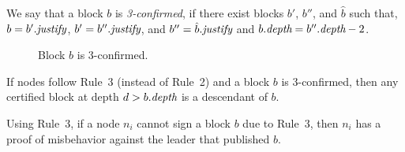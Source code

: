 \begin{definition}
\label{def:3confirmed}	
We say that a block $b$ is \emph{3-confirmed}, if there exist blocks $b'$, $b''$, and $\hat{b}$ such that, $b=b'.\textit{justify}$, $b'=b''.\textit{justify}$, and $b''=\hat{b}.\textit{justify}$ 
and $b.\textit{depth} = b''.\textit{depth}-2$.	
\end{definition}

\begin{figure}
	\centering
	
	\caption{Block $b$ is 3-confirmed.}
\end{figure}

\begin{theorem}
If nodes follow Rule~3 (instead of Rule~2) and a block $b$ is 3-confirmed, then any certified block at depth $d>b.\textit{depth}$ is a descendant of $b$.
\end{theorem}

\begin{theorem}[Speculation]
Using Rule~3, if a node $n_i$ cannot sign a block $b$ due to Rule~3, then $n_i$ has a proof of misbehavior against the leader that published $b$.
\end{theorem}